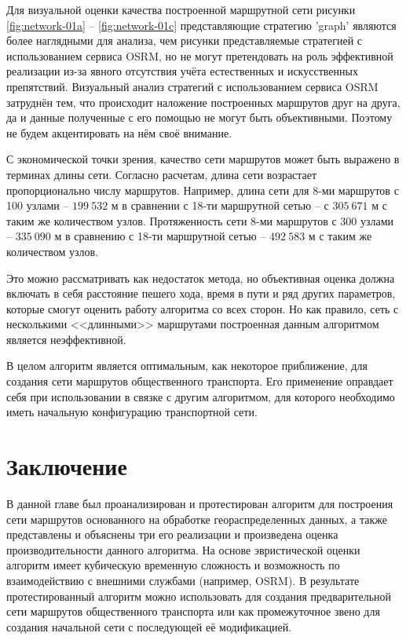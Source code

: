 Для визуальной оценки качества построенной маршрутной сети рисунки \ref{fig:network-01a} -- 
\ref{fig:network-01c} представляющие стратегию 'graph' являются более наглядными для анализа, чем рисунки 
представляемые стратегией с использованием сервиса OSRM, но не могут претендовать на роль эффективной 
реализации из-за явного отсутствия учёта естественных и искусственных препятствий. Визуальный анализ 
стратегий с использованием сервиса OSRM затруднён тем, что происходит наложение построенных маршрутов друг 
на друга, да и данные полученные с его помощью не могут быть объективными. Поэтому не будем акцентировать на 
нём своё внимание.

С экономической точки зрения, качество сети маршрутов может быть выражено в терминах длины сети. Согласно 
расчетам, длина сети возрастает пропорционально числу маршрутов. Например, длина сети для 8-ми маршрутов с 
100 узлами -- \( 199\ 532 \) м в сравнении с 18-ти маршрутной сетью -- с \( 305\ 671 \) м с таким же 
количеством узлов. Протяженность сети 8-ми маршрутов с 300 узлами -- \( 335\ 090 \) м в сравнению с 18-ти 
маршрутной сетью -- \( 492\ 583 \) м с таким же количеством узлов. 

Это можно рассматривать как недостаток метода, но объективная оценка должна включать в себя расстояние 
пешего хода, время в пути и ряд других параметров, которые смогут оценить работу алгоритма со всех сторон. 
Но как правило, сеть с несколькими <<длинными>> маршрутами построенная данным алгоритмом является 
неэффективной.

В целом алгоритм является оптимальным, как некоторое приближение, для создания сети маршрутов общественного 
транспорта. Его применение оправдает себя при использовании в связке с другим алгоритмом, для которого 
необходимо иметь начальную конфигурацию транспортной сети.

\section{Заключение}
В данной главе был проанализирован и протестирован алгоритм для построения сети маршрутов основанного на 
обработке геораспределенных данных, а также представлены и объяснены три его реализации и произведена оценка 
производительности данного алгоритма. На основе эвристической оценки алгоритм имеет кубическую временную 
сложность и возможность по взаимодействию с внешними службами (например, OSRM). В результате протестированный 
алгоритм можно использовать для создания предварительной сети маршрутов общественного транспорта или как 
промежуточное звено для создания начальной сети с последующей её модификацией.